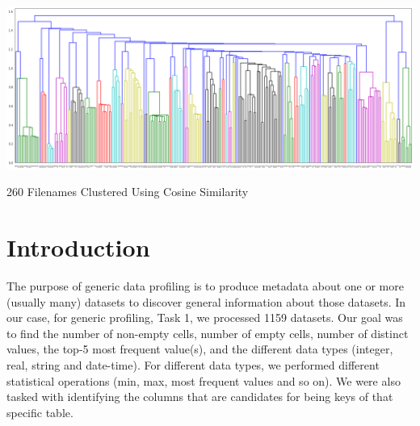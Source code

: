 \documentclass[sigconf,authordraft]{acmart}
\begin{document}


\begin{teaserfigure}
  \includegraphics[width=\textwidth]{dendrogram.png}
  \caption{260 Filenames Clustered Using Cosine Similarity}
  \label{fig:teaser}
\end{teaserfigure}

\maketitle

\section{Introduction}
The purpose of generic data profiling is to produce metadata about one or more (usually many) datasets to discover general information about those datasets. In our case, for generic profiling, Task 1, we 
processed 1159 datasets. Our goal was to find the number of non-empty 
cells, number of empty cells, number of distinct values, the top-5 most 
frequent value(s), and the different data types
(integer, real, string and date-time). For different data types, we 
performed different statistical operations (min, max, most frequent values and so on). We were also tasked with identifying the
columns that are candidates for being keys of that specific table. 
\end{document}
